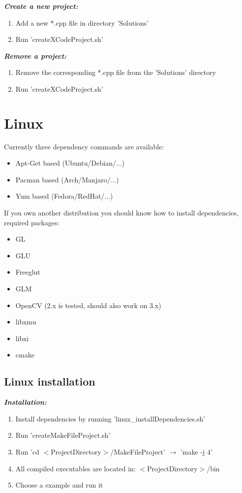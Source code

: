 \documentclass[]{article}
\begin{document}
\textit{\textbf{Create a new project:}}
\begin{enumerate}
\item Add a new *.cpp file in directory 'Solutions'
\item Run 'createXCodeProject.sh' \\
\end{enumerate}

\textit{\textbf{Remove a project:}}
\begin{enumerate}
\item Remove the corresponding *.cpp file from the 'Solutions' directory
\item Run 'createXCodeProject.sh' \\
\end{enumerate}

\newpage
\section{Linux}\label{Linux}
Currently three dependency commands are available:
\begin{itemize}
	\item Apt-Get based (Ubuntu/Debian/...) 
	\item Pacman based (Arch/Manjaro/...)
	\item Yum based (Fedora/RedHat/...) \\
\end{itemize}

If you own another distribution you should know how to install dependencies, required packages:
\begin{itemize}
	\item GL
	\item GLU
	\item Freeglut
	\item GLM
	\item OpenCV (2.x is tested, should also work on 3.x)
	\item libxmu 
	\item libxi
	\item cmake \\
\end{itemize}

\subsection{Linux installation}

\textit{\textbf{Installation:}}
\begin{enumerate}
	\item Install dependencies by running 'linux\_installDependencies.sh'
	\item Run 'createMakeFileProject.sh'
	\item Run 'cd $<$ProjectDirectory$>$/MakeFileProject' $\rightarrow$ 'make -j 4'
	\item All compiled executables are located in: $<$ProjectDirectory$>$/bin
	\item Choose a example and run it \\
\end{enumerate}
\end{document}
